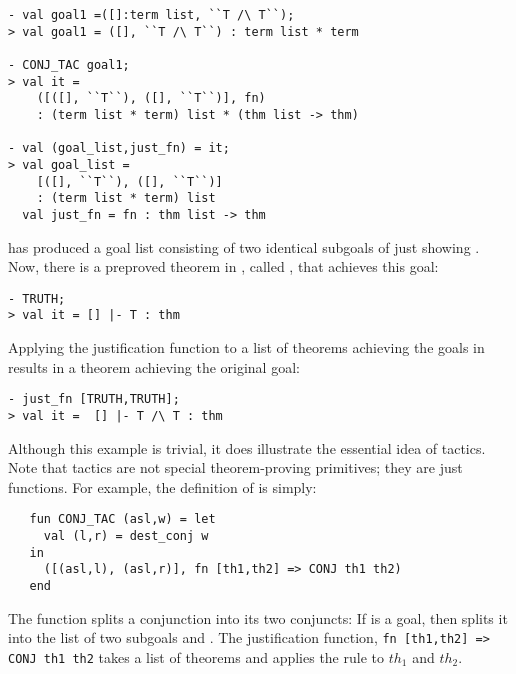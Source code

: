 \begin{session}\begin{verbatim}
- val goal1 =([]:term list, ``T /\ T``);
> val goal1 = ([], ``T /\ T``) : term list * term

- CONJ_TAC goal1;
> val it =
    ([([], ``T``), ([], ``T``)], fn)
    : (term list * term) list * (thm list -> thm)

- val (goal_list,just_fn) = it;
> val goal_list =
    [([], ``T``), ([], ``T``)]
    : (term list * term) list
  val just_fn = fn : thm list -> thm
\end{verbatim}\end{session}

\noindent {} has produced a goal  list consisting  of two identical
subgoals of just showing .  Now, there is a preproved
theorem in \HOL, called , that achieves this goal:

\begin{session}\begin{verbatim}
- TRUTH;
> val it = [] |- T : thm
\end{verbatim}\end{session}

\noindent Applying the justification function  to a list
of theorems achieving the goals in  results
in a theorem achieving the original goal:

\begin{session}\begin{verbatim}
- just_fn [TRUTH,TRUTH];
> val it =  [] |- T /\ T : thm
\end{verbatim}\end{session}

    Although this example is trivial, it does illustrate the essential
    idea of tactics.  Note that tactics are not special
    theorem-proving primitives; they are just \ML{} functions.  For
    example, the definition of  is simply:

\begin{hol}\begin{verbatim}
   fun CONJ_TAC (asl,w) = let
     val (l,r) = dest_conj w
   in
     ([(asl,l), (asl,r)], fn [th1,th2] => CONJ th1 th2)
   end
\end{verbatim}\end{hol}

\noindent The function  splits a conjunction into its
two conjuncts: If  is a
goal, then  splits it into the list of two subgoals
 and . The justification function,
{\small\verb|fn [th1,th2] => CONJ th1 th2|} takes a list
\ml{[$th_1$,$th_2$]} of theorems and applies the rule  to
$th_1$ and $th_2$.

